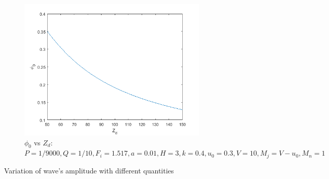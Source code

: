 \documentclass[journal]{IEEEtran}
\begin{document}
\begin{figure}
		\begin{subfigure}[b]{1\linewidth}
			\includegraphics[width=\linewidth]{"kdv amplitude vs dust charge"}
			\caption{$\phi_0$ vs $Z_d$:$ P = 1/9000, Q = 1/10,	F_i = 1.517, a = 0.01, H = 3, k = 0.4, u_0 = 0.3, 	V = 10,	M_j = V - u_0, M_n = 1$ }
		\end{subfigure}
		
		\caption{Variation of wave's amplitude with different quantities}
		\label{fig:fig6}
	\end{figure}
\end{document}
